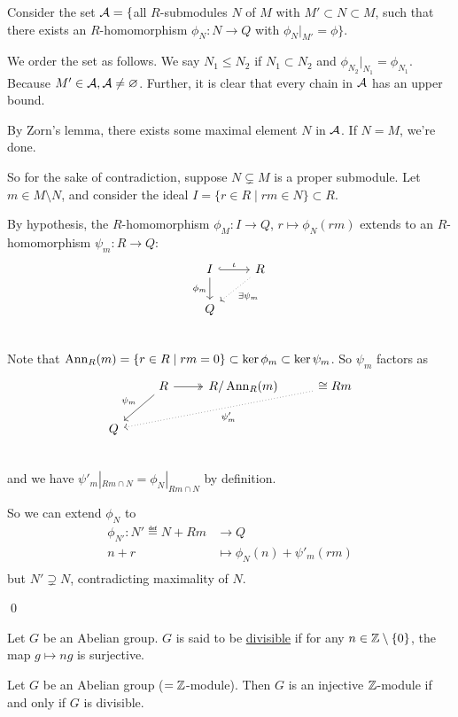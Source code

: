 \documentclass[x11names,reqno,14pt]{extarticle}
\begin{document}
Consider the set $\mathcal{A} = \{$all $R$-submodules $N$ of $M$ with $M'\subset N \subset M$, such that there exists an $R$-homomorphism $\phi_N:N\to Q$ with $\phi_N|_{M'}=\phi\}$. 

We order the set as follows. We say $N_1\leq N_2$ if $N_1 \subset N_2$ and $\phi_{N_2}|_{N_1} = \phi_{N_1}$. Because $M'\in\mathcal{A}, \mathcal{A}\neq\varnothing$. Further, it is clear that every chain in $\mathcal{A}$ has an upper bound. 

By Zorn's lemma, there exists some maximal element $N$ in $\mathcal{A}$. If $N = M$, we're done. 

So for the sake of contradiction, suppose $N\subsetneq M$ is a proper submodule. Let $m \in M\setminus N$, and consider the ideal  $I = \{r\in R \mid rm\in N\}\subset R$. 

By hypothesis, the $R$-homomorphism $\phi_M:I\to Q$, $r\mapsto \phi_N(rm)$ extends to an $R$-homomorphism $\psi_m:R\to Q$:
\[
\begin{tikzcd}
I\ar[d, "\phi_m"'] \ar[r, hook, "\iota"] & R \ar[dl, dotted, "\exists \psi_m"] \\
Q& \\
\end{tikzcd}
\]
Note that $\operatorname{\mathrm{Ann}}_R(m) = \{r\in R\mid rm = 0\} \subset \ker\phi_m\subset\ker\psi_m$. So $\psi_m$ factors as 
\[
\begin{tikzcd}
& R\ar[ld, "\psi_m"']\ar[r, twoheadrightarrow] & R/\Ann_R(m)&\cong Rm\ar[dlll, dotted, "\psi'_m"]\\
Q & & & \\
\end{tikzcd}
\]
and we have $\psi'_m|_{Rm\cap N} = \phi_N|_{Rm\cap N}$ by definition. 

So we can extend $\phi_N$ to 
\begin{align*}
\phi_{N'}:N' \eqdef N + Rm &\to Q \\
n + r& \mapsto \phi_N(n) + \psi'_m(rm) \\
\end{align*}
but $N' \supsetneq N$, contradicting maximality of $N$. 

\qed


Let $G$ be an Abelian group. $G$ is said to be \underline{divisible} if for any $n\in \mathbb{Z}\setminus\{0\}$, the map $g\mapsto ng$ is surjective. 

\prop

Let $G$ be an Abelian group ($=\mathbb{Z}$-module). Then $G$ is an injective $\mathbb{Z}$-module if and only if $G$ is divisible.
\end{document}
